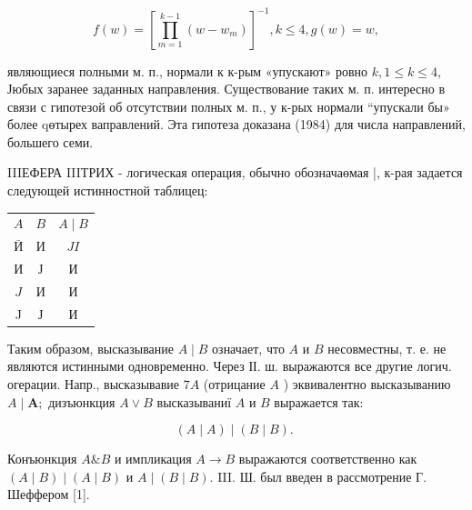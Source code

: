 \documentclass[10pt]{article}
\begin{document}
\[

f(w)=\left[\prod_{m=1}^{k-1}\left(w-w_{m}\right)\right]^{-1}, k \leqslant 4, g(w)=w,

\]



являющиеся полными м. п., нормали к к-рым «упускают» ровно $k, 1 \leqslant k \leqslant 4$, Јюбых заранее заданных направления. Существование таких м. п. интересно в связи с гипотезой об отсутствии полных м. п., у к-рых нормали “упускали бы» более qөтырех ваправлений. Эта гипотеза доказана (1984) для числа направлений, большего семи.



IIIЕФЕРА IIIТРИХ - логическая операция, обычно обозначаөмая |, к-рая задается следующей истинностной таблицец:



\begin{center}

\begin{tabular}{c|c|c}

$A$ & $B$ & $A \mid B$ \\

$\bar{И}$ & $И$ & $J I$ \\

$И$ & $Ј$ & $И$ \\

$J$ & $И$ & $И$ \\

J & Ј & И \\

\end{tabular}

\end{center}



Таким образом, высказывание $A \mid B$ означает, что $A$ и $B$ несовместны, т. е. не являются истинными одновременно. Через ІІ. ш. выражаются все другие логич. огерации. Напр., высказывавие $7 A$ (отрицание $A$ ) эквивалентно высказыванию $A \mid \boldsymbol{A} ;$ дизъюнкция $A \vee B$ высказываниї $A$ и $B$ выражается так:



\[

(A \mid A) \mid(B \mid B) \text {. }

\]



Конъюнкция $A \& B$ и импликация $A \rightarrow B$ выражаются соответственно как $(A \mid B) \mid(A \mid B)$ и $A \mid(B \mid B)$. III. Ш. был введен в рассмотрение Г. Шеффером [1].
\end{document}
